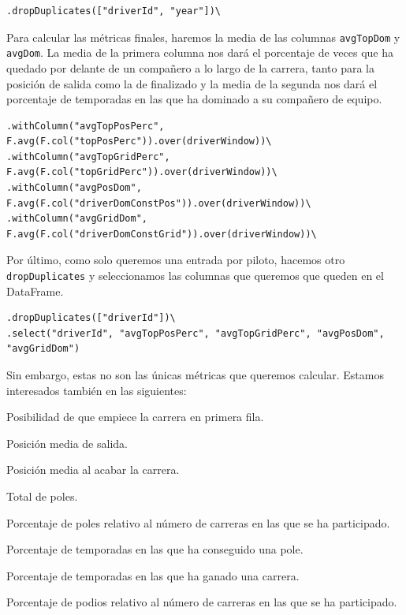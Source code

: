 \documentclass[12pt,twoside,titlepage]{report}
\begin{document}
\begin{lstlisting}
.dropDuplicates(["driverId", "year"])\	
\end{lstlisting}

Para calcular las métricas finales, haremos la media de las columnas \texttt{avgTopDom} y \texttt{avgDom}. La media de la primera columna nos dará el porcentaje de veces que ha quedado por delante de un compañero a lo largo de la carrera, tanto para la posición de salida como la de finalizado y la media de la segunda nos dará el porcentaje de temporadas en las que ha dominado a su compañero de equipo.

\begin{lstlisting}
.withColumn("avgTopPosPerc", F.avg(F.col("topPosPerc")).over(driverWindow))\
.withColumn("avgTopGridPerc", F.avg(F.col("topGridPerc")).over(driverWindow))\
.withColumn("avgPosDom", F.avg(F.col("driverDomConstPos")).over(driverWindow))\
.withColumn("avgGridDom", F.avg(F.col("driverDomConstGrid")).over(driverWindow))\
\end{lstlisting}

Por último, como solo queremos una entrada por piloto, hacemos otro \texttt{dropDuplicates} y seleccionamos las columnas que queremos que queden en el DataFrame.

\begin{lstlisting}
.dropDuplicates(["driverId"])\
.select("driverId", "avgTopPosPerc", "avgTopGridPerc", "avgPosDom", "avgGridDom")
\end{lstlisting}

Sin embargo, estas no son las únicas métricas que queremos calcular. Estamos interesados también en las siguientes:

\begin{compactitem}
	\item Posibilidad de que empiece la carrera en primera fila.
	\item Posición media de salida.
	\item Posición media al acabar la carrera.
	\item Total de poles.
	\item Porcentaje de poles relativo al número de carreras en las que se ha participado.
	\item Porcentaje de temporadas en las que ha conseguido una pole.
	\item Porcentaje de temporadas en las que ha ganado una carrera.
	\item Porcentaje de podios relativo al número de carreras en las que se ha participado.
\end{compactitem}
\end{document}
